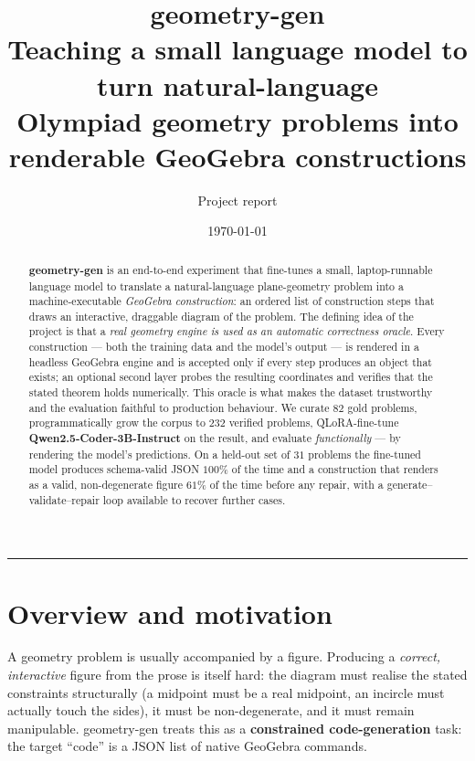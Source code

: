\documentclass[11pt]{article}
\title{\textbf{geometry-gen}\\[4pt]
\large Teaching a small language model to turn natural-language\\
Olympiad geometry problems into renderable GeoGebra constructions}
\author{Project report}
\date{\today}
\begin{document}
\maketitle

\begin{abstract}
\noindent
\textbf{geometry-gen} is an end-to-end experiment that fine-tunes a small,
laptop-runnable language model to translate a natural-language plane-geometry
problem into a machine-executable \emph{GeoGebra construction}: an ordered list
of construction steps that draws an interactive, draggable diagram of the
problem. The defining idea of the project is that a \emph{real geometry engine
is used as an automatic correctness oracle}. Every construction --- both the
training data and the model's output --- is rendered in a headless GeoGebra
engine and is accepted only if every step produces an object that exists; an
optional second layer probes the resulting coordinates and verifies that the
stated theorem holds numerically. This oracle is what makes the dataset
trustworthy and the evaluation faithful to production behaviour. We curate $82$
gold problems, programmatically grow the corpus to $232$ verified problems,
QLoRA-fine-tune \textbf{Qwen2.5-Coder-3B-Instruct} on the result, and evaluate
\emph{functionally} --- by rendering the model's predictions. On a held-out set
of $31$ problems the fine-tuned model produces schema-valid JSON $100\%$ of the
time and a construction that renders as a valid, non-degenerate figure $61\%$ of
the time before any repair, with a generate--validate--repair loop available to
recover further cases.
\end{abstract}

\tableofcontents
\bigskip\hrule

\section{Overview and motivation}

A geometry problem is usually accompanied by a figure. Producing a
\emph{correct, interactive} figure from the prose is itself hard: the diagram
must realise the stated constraints structurally (a midpoint must be a real
midpoint, an incircle must actually touch the sides), it must be
non-degenerate, and it must remain manipulable. geometry-gen treats this as a
\textbf{constrained code-generation} task: the target ``code'' is a JSON list of
native GeoGebra commands.
\end{document}
